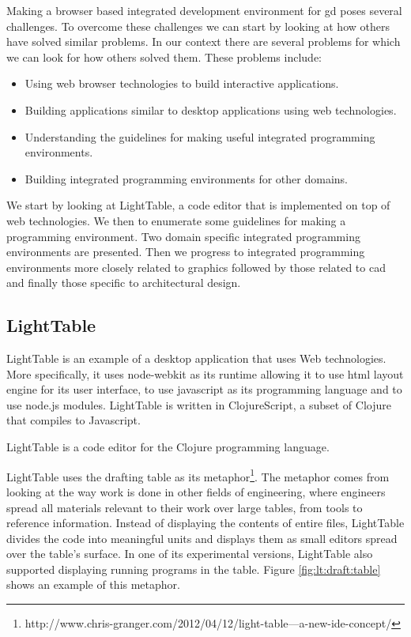 \documentclass{./llncs2e/llncs}
\begin{document}
	Making a browser based integrated development environment for \ac{gd} poses several challenges.
	To overcome these challenges we can start by looking at how others have solved similar problems.
	In our context there are several problems for which we can look for how others solved them.
	These problems include:
	\begin{itemize}
		\item Using web browser technologies to build interactive applications.
		\item Building applications similar to desktop applications using web technologies.
		\item Understanding the guidelines for making useful integrated programming environments.
		\item Building integrated programming environments for other domains.
	\end{itemize}

	We start by looking at LightTable, a code editor that is implemented on top of web technologies.
	We then to enumerate some guidelines for making a programming environment.
	Two domain specific integrated programming environments are presented.
	Then we progress to integrated programming environments more closely related to graphics followed by those related to \ac{cad} and finally those specific to architectural design.

\subsection{LightTable}
	LightTable is an example of a desktop application that uses Web technologies.
	More specifically, it uses node-webkit as its runtime allowing it to use html layout engine for its user interface, to use javascript as its programming language and to use node.js modules.
	LightTable is written in ClojureScript\cite{10.1109/MIC.2011.148}, a subset of Clojure that compiles to Javascript.

	LightTable is a code editor for the Clojure programming language\cite{hickey2008clojure}. 


	LightTable uses the drafting table as its metaphor\footnote{http://www.chris-granger.com/2012/04/12/light-table---a-new-ide-concept/}. 
	The metaphor comes from looking at the way work is done in other fields of engineering, where engineers spread all materials relevant to their work over large tables, from tools to reference information. 
	Instead of displaying the contents of entire files, LightTable divides the code into meaningful units and displays them as small editors spread over the table's surface. 
	In one of its experimental versions, LightTable also supported displaying running programs in the table. 
	Figure \ref{fig:lt:draft:table} shows an example of this metaphor.
\end{document}
